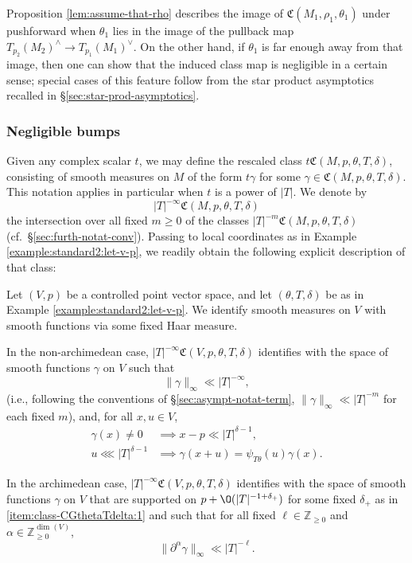 \begin{remark}\label{remark:crb2bq4vf9}
  Proposition \ref{lem:assume-that-rho} describes the image of $\mathfrak{C}(M_1, \rho_1, \theta_1)$ under pushforward when $\theta_1$ lies in the image of the pullback map $T_{p_2}(M_2)^\wedge \rightarrow T_{p_1}(M_1)^\vee$.  On the other hand, if $\theta_1$ is far enough away from that image, then one can show that the induced class map is negligible in a certain sense; special cases of this feature follow from the star product asymptotics recalled in \S\ref{sec:star-prod-asymptotics}.
\end{remark}


\subsubsection{Negligible bumps}
Given any complex scalar $t$, we may define the rescaled class $t \mathfrak{C}(M,p,\theta,T,\delta)$, consisting of smooth measures on $M$ of the form $t \gamma$ for some $\gamma \in \mathfrak{C}(M,p,\theta,T,\delta)$.  This notation applies in particular when $t$ is a power of $|T|$.  We denote by
\begin{equation*}
  |T|^{-\infty} \mathfrak{C}(M,p,\theta,T,\delta)
\end{equation*}
the intersection over all fixed $m \geq 0$ of the classes $|T|^{-m} \mathfrak{C}(M,p,\theta,T,\delta)$ (cf.\ \S\ref{sec:furth-notat-conv}).  Passing to local coordinates as in Example \ref{example:standard2:let-v-p}, we readily obtain the following explicit description of that class:
\begin{lemma}\label{lem:standard2:let-v-p}
  Let $(V,p)$ be a controlled point vector space, and let $(\theta,T,\delta)$ be as in Example \ref{example:standard2:let-v-p}.  We identify smooth measures on $V$ with smooth functions via some fixed Haar measure.

  In the non-archimedean case, $|T|^{-\infty} \mathfrak{C}(V,p,\theta,T,\delta)$ identifies with the space of smooth functions $\gamma$ on $V$ such that
  \begin{equation}\label{eq:gamma-_infty-ll}
    \|\gamma \|_{\infty} \ll |T|^{-\infty},
  \end{equation}
  (i.e., following the conventions of \S\ref{sec:asympt-notat-term}, $\|\gamma \|_{\infty} \ll |T|^{-m}$ for each fixed $m$), and, for all $x,u \in V$,
  \begin{align*}
    \gamma(x) \neq 0 &\implies x - p \ll  |T|^{\delta-1}, \\
    u \lll |T|^{\delta-1} &\implies \gamma(x+u) = \psi_{T \theta}(u) \gamma(x).
  \end{align*}

  In the archimedean case,  $|T|^{-\infty} \mathfrak{C}(V,p,\theta,T,\delta)$ identifies with the space of smooth functions $\gamma$ on $V$ that are supported on  $p + \O(|T|^{-1 + \delta_+})$ for some fixed $\delta_+$ as in  \eqref{item:class-CGthetaTdelta:1} and such that for all fixed $\ell \in \mathbb{Z}_{\geq 0}$ and $\alpha \in \mathbb{Z}_{\geq 0}^{\dim(V)}$,
  \begin{equation*}
    \|\partial^\alpha \gamma\|_{\infty}
    \ll |T|^{-\ell}.
  \end{equation*}
\end{lemma}
